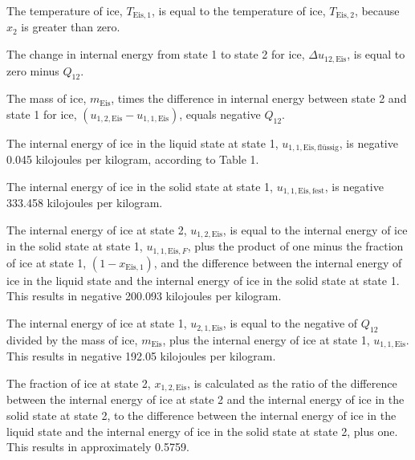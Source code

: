The temperature of ice, \( T_{\text{Eis},1} \), is equal to the temperature of ice, \( T_{\text{Eis},2} \), because \( x_2 \) is greater than zero.

The change in internal energy from state 1 to state 2 for ice, \( \Delta u_{12,\text{Eis}} \), is equal to zero minus \( Q_{12} \).

The mass of ice, \( m_{\text{Eis}} \), times the difference in internal energy between state 2 and state 1 for ice, \( (u_{1,2,\text{Eis}} - u_{1,1,\text{Eis}}) \), equals negative \( Q_{12} \).

The internal energy of ice in the liquid state at state 1, \( u_{1,1,\text{Eis},\text{flüssig}} \), is negative 0.045 kilojoules per kilogram, according to Table 1.

The internal energy of ice in the solid state at state 1, \( u_{1,1,\text{Eis},\text{fest}} \), is negative 333.458 kilojoules per kilogram.

The internal energy of ice at state 2, \( u_{1,2,\text{Eis}} \), is equal to the internal energy of ice in the solid state at state 1, \( u_{1,1,\text{Eis},F} \), plus the product of one minus the fraction of ice at state 1, \( (1 - x_{\text{Eis},1}) \), and the difference between the internal energy of ice in the liquid state and the internal energy of ice in the solid state at state 1. This results in negative 200.093 kilojoules per kilogram.

The internal energy of ice at state 1, \( u_{2,1,\text{Eis}} \), is equal to the negative of \( Q_{12} \) divided by the mass of ice, \( m_{\text{Eis}} \), plus the internal energy of ice at state 1, \( u_{1,1,\text{Eis}} \). This results in negative 192.05 kilojoules per kilogram.

The fraction of ice at state 2, \( x_{1,2,\text{Eis}} \), is calculated as the ratio of the difference between the internal energy of ice at state 2 and the internal energy of ice in the solid state at state 2, to the difference between the internal energy of ice in the liquid state and the internal energy of ice in the solid state at state 2, plus one. This results in approximately 0.5759.